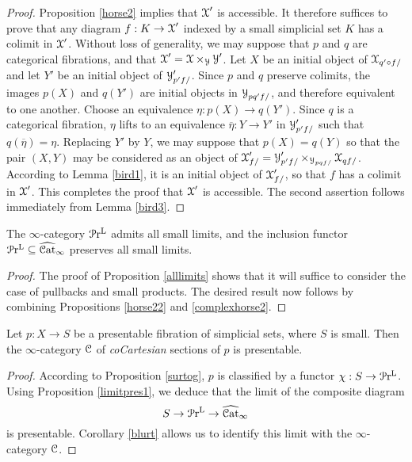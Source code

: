 \begin{proof}
Proposition \ref{horse2} implies that $\operatorname{\mathcal{X}}'$ is accessible. It therefore suffices to prove that
any diagram $f: K \rightarrow \operatorname{\mathcal{X}}'$ indexed by a small simplicial set $K$ has a colimit in $\operatorname{\mathcal{X}}'$. 
Without loss of generality, we may suppose that $p$ and $q$ are categorical fibrations, and that
$\operatorname{\mathcal{X}}' = \operatorname{\mathcal{X}} \times_{ \operatorname{\mathcal{Y}}} \operatorname{\mathcal{Y}}'$. Let $X$ be an initial object of $\operatorname{\mathcal{X}}_{q' \circ f/}$ and let
$Y'$ be an initial object of $\operatorname{\mathcal{Y}}'_{p' f/}$. Since $p$ and $q$ preserve colimits, 
the images $p(X)$ and $q(Y')$ are initial objects in $\operatorname{\mathcal{Y}}_{p q' f/}$, and therefore equivalent to one another. Choose an equivalence $\eta: p(X) \rightarrow q(Y')$. Since $q$ is a categorical fibration, $\eta$ lifts to an equivalence $\overline{\eta}: Y \rightarrow Y'$ in $\operatorname{\mathcal{Y}}'_{p' f/}$ such that $q(\overline{\eta}) = \eta$. Replacing $Y'$ by $Y$, we may suppose that
$p(X) = q(Y)$ so that the pair $(X,Y)$ may be considered as an object of
$ \operatorname{\mathcal{X}}'_{f/} = \operatorname{\mathcal{Y}}'_{ p' f/} \times_{ \operatorname{\mathcal{Y}}_{p q f/}} \operatorname{\mathcal{X}}_{q f/}$. 
According to Lemma \ref{bird1}, it is an initial object of $\operatorname{\mathcal{X}}'_{f/}$, so that $f$ has a colimit in $\operatorname{\mathcal{X}}'$. This completes the proof that $\operatorname{\mathcal{X}}'$ is accessible. The second assertion follows immediately from Lemma \ref{bird3}. 
\end{proof}

\begin{proposition}\label{limitpres1}
The $\infty$-category $\operatorname{\mathcal{P}r^{L}}$ admits all small limits, and the inclusion functor
$\operatorname{\mathcal{P}r^{L}} \subseteq \widehat{\operatorname{\mathcal{C}at}}_{\infty}$ preserves all small limits.
\end{proposition}

\begin{proof}
The proof of Proposition \ref{alllimits} shows that it will suffice to consider the case of pullbacks and small products. The desired result now follows by combining Propositions \ref{horse22} and
\ref{complexhorse2}.
\end{proof}

\begin{corollary}\label{kevinet}
Let $p: X \rightarrow S$ be a presentable fibration of simplicial sets, where $S$ is small. Then the $\infty$-category $\operatorname{\mathcal{C}}$ of {\em coCartesian} sections of $p$ is presentable.
\end{corollary}

\begin{proof}
According to Proposition \ref{surtog}, $p$ is classified by a functor
$\chi: S \rightarrow \operatorname{\mathcal{P}r^{L}}$. Using Proposition \ref{limitpres1}, we deduce that
the limit of the composite diagram
$$ S \rightarrow \operatorname{\mathcal{P}r^{L}} \rightarrow \widehat{\operatorname{\mathcal{C}at}}_{\infty}$$
is presentable. Corollary \ref{blurt} allows us to identify this limit with the $\infty$-category $\operatorname{\mathcal{C}}$.
\end{proof}

